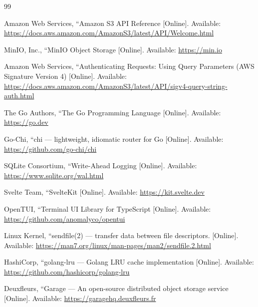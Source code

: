 \documentclass[12pt,a4paper]{report}
\begin{document}
\renewcommand{\bibname}{\centering \normalfont\Large\bfseries 9. References}
\begin{thebibliography}{99}

Amazon Web Services, ``Amazon S3 API Reference [Online]. Available: \url{https://docs.aws.amazon.com/AmazonS3/latest/API/Welcome.html}

MinIO, Inc., ``MinIO Object Storage [Online]. Available: \url{https://min.io}

Amazon Web Services, ``Authenticating Requests: Using Query Parameters (AWS Signature Version 4) [Online]. Available: \url{https://docs.aws.amazon.com/AmazonS3/latest/API/sigv4-query-string-auth.html}

The Go Authors, ``The Go Programming Language [Online]. Available: \url{https://go.dev}

Go-Chi, ``chi --- lightweight, idiomatic router for Go [Online]. Available: \url{https://github.com/go-chi/chi}

SQLite Consortium, ``Write-Ahead Logging [Online]. Available: \url{https://www.sqlite.org/wal.html}

Svelte Team, ``SvelteKit [Online]. Available: \url{https://kit.svelte.dev}

OpenTUI, ``Terminal UI Library for TypeScript [Online]. Available: \url{https://github.com/anomalyco/opentui}

Linux Kernel, ``sendfile(2) --- transfer data between file descriptors. [Online]. Available: \url{https://man7.org/linux/man-pages/man2/sendfile.2.html}

HashiCorp, ``golang-lru --- Golang LRU cache implementation [Online]. Available: \url{https://github.com/hashicorp/golang-lru}

Deuxfleurs, ``Garage --- An open-source distributed object storage service [Online]. Available: \url{https://garagehq.deuxfleurs.fr}

\end{thebibliography}
\end{document}
